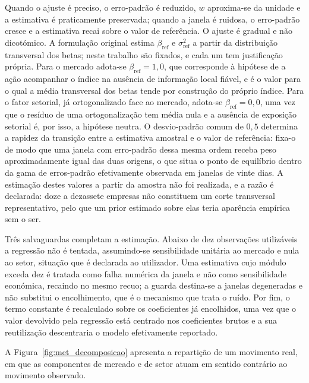 Quando o ajuste é preciso, o erro-padrão é reduzido, $w$ aproxima-se da unidade e a estimativa é
praticamente preservada; quando a janela é ruidosa, o erro-padrão cresce e a estimativa recai sobre
o valor de referência. O ajuste é gradual e não dicotómico. A formulação original estima
$\beta_{\text{ref}}$ e $\sigma^2_{\text{ref}}$ a partir da distribuição transversal dos betas;
neste trabalho são fixados, e cada um tem justificação própria. Para o mercado adota-se
$\beta_{\text{ref}} = 1{,}0$, que corresponde à hipótese de a ação acompanhar o índice na ausência
de informação local fiável, e é o valor para o qual a média transversal dos betas tende por
construção do próprio índice. Para o fator setorial, já ortogonalizado face ao mercado, adota-se
$\beta_{\text{ref}} = 0{,}0$, uma vez que o resíduo de uma ortogonalização tem média nula e a
ausência de exposição setorial é, por isso, a hipótese neutra. O desvio-padrão comum de $0{,}5$
determina a rapidez da transição entre a estimativa amostral e o valor de referência: fixa-o de
modo que uma janela com erro-padrão dessa mesma ordem receba peso aproximadamente igual das duas
origens, o que situa o ponto de equilíbrio dentro da gama de erros-padrão efetivamente observada em
janelas de vinte dias. A estimação destes valores a partir da amostra não foi realizada, e a razão
é declarada: doze a dezassete empresas não constituem um corte transversal representativo, pelo que
um prior estimado sobre elas teria aparência empírica sem o ser.

Três salvaguardas completam a estimação. Abaixo de dez observações utilizáveis a regressão não é
tentada, assumindo-se sensibilidade unitária ao mercado e nula ao setor, situação que é declarada
ao utilizador. Uma estimativa cujo módulo exceda dez é tratada como falha numérica da janela e não
como sensibilidade económica, recaindo no mesmo recuo; a guarda destina-se a janelas degeneradas e
não substitui o encolhimento, que é o mecanismo que trata o ruído. Por fim, o termo constante é
recalculado sobre os coeficientes já encolhidos, uma vez que o valor devolvido pela regressão está
centrado nos coeficientes brutos e a sua reutilização descentraria o modelo efetivamente reportado.

A Figura~\ref{fig:met_decomposicao} apresenta a repartição de um movimento real, em que as
componentes de mercado e de setor atuam em sentido contrário ao movimento observado.

